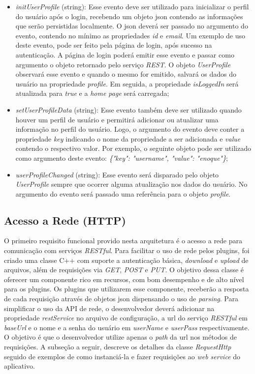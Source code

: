 \begin{itemize}
\begin{itemize}
		\item \textit{initUserProfile} (string): Esse evento deve ser utilizado para inicializar o perfil do usuário após o login, recebendo um objeto json contendo as informações que serão persistidas localmente. O json deverá ser passado no argumento do evento, contendo no mínimo as propriedades \textit{id} e \textit{email}. Um exemplo de uso deste evento, pode ser feito pela página de login, após sucesso na autenticação. A página de login poderá emitir esse evento e passar como argumento o objeto retornado pelo serviço \textit{REST}. O objeto \textit{UserProfile} observará esse evento e quando o mesmo for emitido, salvará os dados do usuário na propriedade \textit{profile}. Em seguida, a propriedade \textit{isLoggedIn} será atualizada para \textit{true} e a \textit{home page} será carregada;

		\item \textit{setUserProfileData} (string): Esse evento também deve ser utilizado quando houver um perfil de usuário e permitirá adicionar ou atualizar uma informação no perfil do usuário. Logo, o argumento do evento deve conter a propriedade \textit{key} indicando o nome da propriedade a ser adicionada e \textit{value} contendo o respectivo valor. Por exemplo, o seguinte objeto pode ser utilizado como argumento deste evento: \textit{\{"key": "username", "value": "enoque"\}};

		\item \textit{userProfileChanged} (string): Esse evento será disparado pelo objeto \textit{UserProfile} sempre que ocorrer alguma atualização nos dados do usuário. No argumento do evento será passado uma referência para o objeto \textit{profile}.
	\end{itemize}
\end{itemize}


\subsection{Acesso a Rede (HTTP)}\label{sec:solucao-desenvolvida}
O primeiro requisito funcional provido nesta arquitetura é o acesso a rede para comunicação com serviços \textit{RESTful}. Para facilitar o uso de rede pelos plugins, foi criado uma classe C++ com suporte a autenticação básica, \textit{download} e \textit{upload} de arquivos, além de requisições via \textit{GET}, \textit{POST} e \textit{PUT}. O objetivo dessa classe é oferecer um componente rico em recursos, com bom desempenho e de alto nível para os plugins. Os plugins que utilizarem esse componente, receberão a resposta de cada requisição através de objetos json dispensando o uso de \textit{parsing}. Para simplificar o uso da API de rede, o desenvolvedor deverá adicionar na propriedade \textit{restService} no arquivo de configuração, a url do serviço \textit{RESTful} em \textit{baseUrl} e o nome e a senha do usuário em \textit{userName} e \textit{userPass} respectivamente. O objetivo é que o desenvolvedor utilize apenas o \textit{path} da url nos métodos de requisições. A subseção a seguir, descreve os detalhes da classe \textit{RequestHttp} seguido de exemplos de como instanciá-la e fazer requisições ao \textit{web service} do aplicativo.

